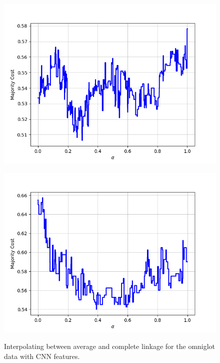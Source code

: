 \begin{figure}[H]
\begin{minipage}{.24\textwidth}
  {\includegraphics[width=\linewidth]{plots/omniglot-intra-ac-cnn/Tagalog}}
\end{minipage}
\begin{minipage}{.24\textwidth}
  \centering
  {\includegraphics[width=\linewidth]{plots/omniglot-intra-ac-cnn/Tifinagh}}
\end{minipage}
\caption{%
  Interpolating between average and complete linkage for the omniglot data with CNN features.}
\label{}
\end{figure}

